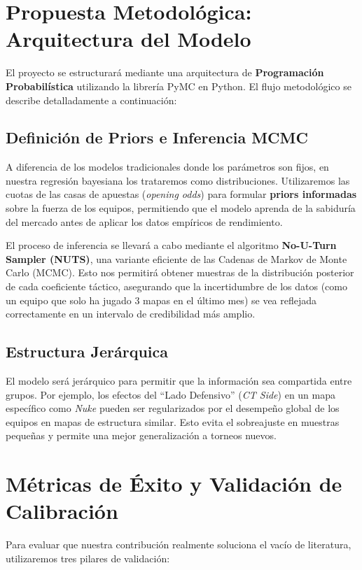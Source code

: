 \documentclass[12pt,a4paper]{article}
\begin{document}
\section{Propuesta Metodológica: Arquitectura del Modelo}

El proyecto se estructurará mediante una arquitectura de \textbf{Programación Probabilística} utilizando la librería PyMC en Python. El flujo metodológico se describe detalladamente a continuación:

\subsection{Definición de Priors e Inferencia MCMC}
A diferencia de los modelos tradicionales donde los parámetros son fijos, en nuestra regresión bayesiana los trataremos como distribuciones. Utilizaremos las cuotas de las casas de apuestas (\textit{opening odds}) para formular \textbf{priors informadas} sobre la fuerza de los equipos, permitiendo que el modelo aprenda de la sabiduría del mercado antes de aplicar los datos empíricos de rendimiento.

El proceso de inferencia se llevará a cabo mediante el algoritmo \textbf{No-U-Turn Sampler (NUTS)}, una variante eficiente de las Cadenas de Markov de Monte Carlo (MCMC). Esto nos permitirá obtener muestras de la distribución posterior de cada coeficiente táctico, asegurando que la incertidumbre de los datos (como un equipo que solo ha jugado 3 mapas en el último mes) se vea reflejada correctamente en un intervalo de credibilidad más amplio.

\subsection{Estructura Jerárquica}
El modelo será jerárquico para permitir que la información sea compartida entre grupos. Por ejemplo, los efectos del ``Lado Defensivo'' (\textit{CT Side}) en un mapa específico como \textit{Nuke} pueden ser regularizados por el desempeño global de los equipos en mapas de estructura similar. Esto evita el sobreajuste en muestras pequeñas y permite una mejor generalización a torneos nuevos.

\section{Métricas de Éxito y Validación de Calibración}

Para evaluar que nuestra contribución realmente soluciona el vacío de literatura, utilizaremos tres pilares de validación:
\end{document}

